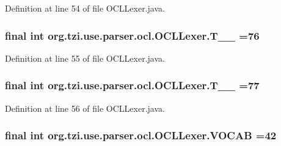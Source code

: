 Definition at line 54 of file O\-C\-L\-Lexer.\-java.

\hypertarget{classorg_1_1tzi_1_1use_1_1parser_1_1ocl_1_1_o_c_l_lexer_a32f491f85dccf43ce70fdbc5e07bd74a}{
\subsubsection[{T\-\_\-\-\_\-76}]{\setlength{\rightskip}{0pt plus 5cm}final int org.\-tzi.\-use.\-parser.\-ocl.\-O\-C\-L\-Lexer.\-T\-\_\-\-\_ =76\hspace{0.3cm}{\ttfamily [static]}}}\label{classorg_1_1tzi_1_1use_1_1parser_1_1ocl_1_1_o_c_l_lexer_a32f491f85dccf43ce70fdbc5e07bd74a}


Definition at line 55 of file O\-C\-L\-Lexer.\-java.

\hypertarget{classorg_1_1tzi_1_1use_1_1parser_1_1ocl_1_1_o_c_l_lexer_a20092f703c0030f4605b9ff076a857d8}{
\subsubsection[{T\-\_\-\-\_\-77}]{\setlength{\rightskip}{0pt plus 5cm}final int org.\-tzi.\-use.\-parser.\-ocl.\-O\-C\-L\-Lexer.\-T\-\_\-\-\_ =77\hspace{0.3cm}{\ttfamily [static]}}}\label{classorg_1_1tzi_1_1use_1_1parser_1_1ocl_1_1_o_c_l_lexer_a20092f703c0030f4605b9ff076a857d8}


Definition at line 56 of file O\-C\-L\-Lexer.\-java.

\hypertarget{classorg_1_1tzi_1_1use_1_1parser_1_1ocl_1_1_o_c_l_lexer_aba61145810604442ade036b17e606cf8}{
\subsubsection[{V\-O\-C\-A\-B}]{\setlength{\rightskip}{0pt plus 5cm}final int org.\-tzi.\-use.\-parser.\-ocl.\-O\-C\-L\-Lexer.\-V\-O\-C\-A\-B =42\hspace{0.3cm}{\ttfamily [static]}}}\label{classorg_1_1tzi_1_1use_1_1parser_1_1ocl_1_1_o_c_l_lexer_aba61145810604442ade036b17e606cf8}



